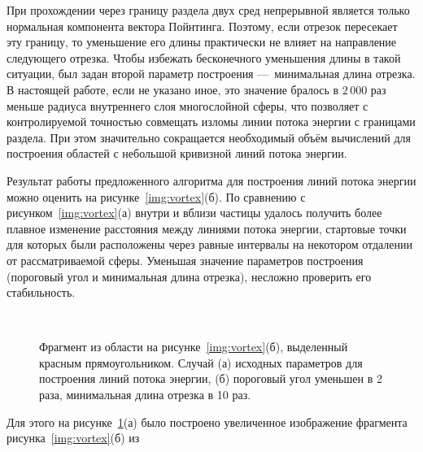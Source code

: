 При прохождении через границу раздела двух сред непрерывной является
только нормальная компонента вектора Пойнтинга. Поэтому, если отрезок
пересекает эту границу, то уменьшение его длины практически не влияет
на направление следующего отрезка. Чтобы избежать бесконечного
уменьшения длины в такой ситуации, был задан второй параметр
построения ---~минимальная длина отрезка.  В настоящей работе, если не
указано иное, это значение бралось в $2\,000$ раз меньше радиуса
внутреннего слоя многослойной сферы, что позволяет с контролируемой
точностью совмещать изломы линии потока энергии с границами
раздела. При этом значительно сокращается необходимый объём вычислений
для построения областей с небольшой кривизной линий потока энергии.

Результат работы предложенного алгоритма для построения линий потока
энергии можно оценить на рисунке~\ref{img:vortex}(б).  По сравнению с
рисунком~\ref{img:vortex}(а) внутри и вблизи частицы удалось получить
более плавное изменение расстояния между линиями потока энергии,
стартовые точки для которых были расположены через равные интервалы на
некотором отдалении от рассматриваемой сферы.  Уменьшая значение параметров
построения (пороговый угол и минимальная длина отрезка), несложно
проверить его стабильность.
\begin{figure}[t] {\centering
  \begin{minipage}[ht]{0.49\linewidth}        
  \end{minipage}
  \begin{minipage}[ht]{0.49\linewidth}
  \end{minipage}
}\\
{\centering
  \begin{minipage}[ht]{0.49\linewidth}
  \end{minipage}
  \begin{minipage}[ht]{0.49\linewidth}
  \end{minipage}
}
\caption{Фрагмент из области на рисунке~\ref{img:vortex}(б),
  выделенный красным прямоугольником. Случай (а) исходных параметров
  для построения линий потока энергии, (б) пороговый угол уменьшен в 2
  раза, минимальная длина отрезка в 10 раз.\label{img:vortex-crop}}
\end{figure}
Для этого на рисунке~\ref{img:vortex-crop}(а) было построено
увеличенное изображение фрагмента рисунка~\ref{img:vortex}(б) из
